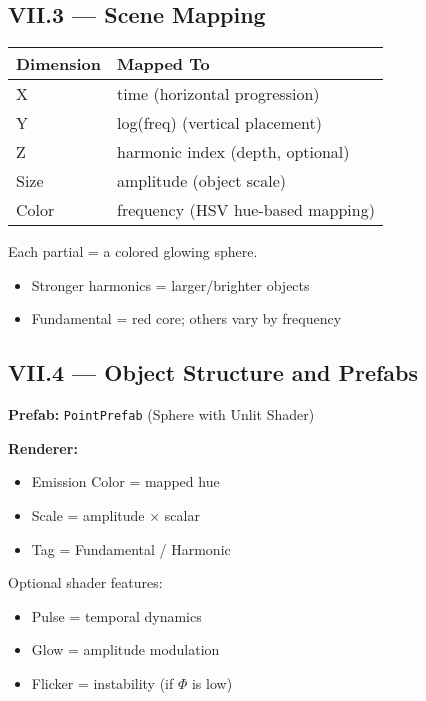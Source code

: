 \subsection*{VII.3 — Scene Mapping}

\begin{center}
\begin{tabular}{|l|l|}
\hline
\textbf{Dimension} & \textbf{Mapped To} \\
\hline
X & time (horizontal progression) \\
Y & log(freq) (vertical placement) \\
Z & harmonic index (depth, optional) \\
Size & amplitude (object scale) \\
Color & frequency (HSV hue-based mapping) \\
\hline
\end{tabular}
\end{center}

Each partial = a colored glowing sphere.

\begin{itemize}
    \item Stronger harmonics = larger/brighter objects
    \item Fundamental = red core; others vary by frequency
\end{itemize}

\subsection*{VII.4 — Object Structure and Prefabs}

\textbf{Prefab:} \texttt{PointPrefab} (Sphere with Unlit Shader)

\textbf{Renderer:}

\begin{itemize}
    \item Emission Color = mapped hue
    \item Scale = amplitude × scalar
    \item Tag = Fundamental / Harmonic
\end{itemize}

Optional shader features:

\begin{itemize}
    \item Pulse = temporal dynamics
    \item Glow = amplitude modulation
    \item Flicker = instability (if $\Phi$ is low)
\end{itemize}

